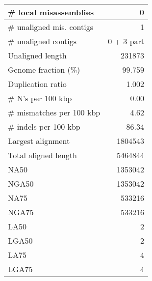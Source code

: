 \documentclass[12pt,a4paper]{article}
\begin{document}
\begin{table}[ht]
\begin{center}
\begin{tabular}{|l*{1}{|r}|}
\# local misassemblies & 0 \\ \hline
\# unaligned mis. contigs & 1 \\ \hline
\# unaligned contigs & 0 + 3 part \\ \hline
Unaligned length & 231873 \\ \hline
Genome fraction (\%) & 99.759 \\ \hline
Duplication ratio & 1.002 \\ \hline
\# N's per 100 kbp & 0.00 \\ \hline
\# mismatches per 100 kbp & 4.62 \\ \hline
\# indels per 100 kbp & 86.34 \\ \hline
Largest alignment & 1804543 \\ \hline
Total aligned length & 5464844 \\ \hline
NA50 & 1353042 \\ \hline
NGA50 & 1353042 \\ \hline
NA75 & 533216 \\ \hline
NGA75 & 533216 \\ \hline
LA50 & 2 \\ \hline
LGA50 & 2 \\ \hline
LA75 & 4 \\ \hline
LGA75 & 4 \\ \hline
\end{tabular}
\end{center}
\end{table}
\end{document}
